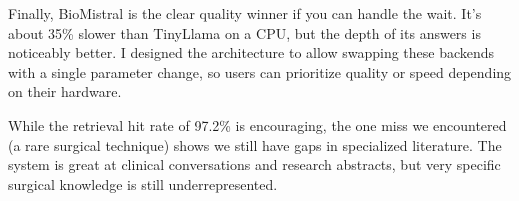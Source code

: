 Finally, BioMistral is the clear quality winner if you can handle the wait. It's about 35\% slower than TinyLlama on a CPU, but the depth of its answers is noticeably better. I designed the architecture to allow swapping these backends with a single parameter change, so users can prioritize quality or speed depending on their hardware. 

While the retrieval hit rate of 97.2\% is encouraging, the one miss we encountered (a rare surgical technique) shows we still have gaps in specialized literature. The system is great at clinical conversations and research abstracts, but very specific surgical knowledge is still underrepresented.
